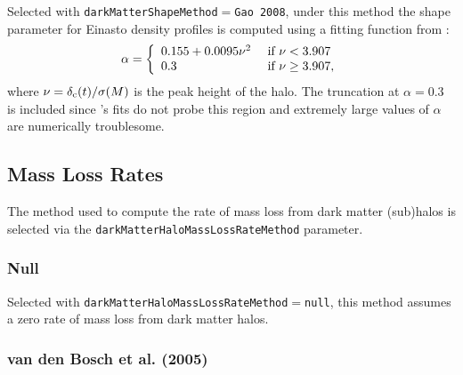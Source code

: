 Selected with {\tt darkMatterShapeMethod}$=${\tt Gao 2008}, under this method the shape parameter for Einasto density profiles is computed using a fitting function from \cite{gao_redshift_2008}:
\begin{equation}
\alpha = \left\{ \begin{array}{ll} 0.155 + 0.0095\nu^2 & \hbox{ if } \nu < 3.907 \\ 0.3 & \hbox{ if } \nu \ge 3.907, \end{array} \right.
\end{equation}
where $\nu=\delta_{\rm c}(t)/\sigma(M)$ is the peak height of the halo. The truncation at $\alpha = 0.3$ is included since \cite{gao_redshift_2008}'s fits do not probe this region and extremely large values of $\alpha$ are numerically troublesome.

\subsection{Mass Loss Rates}

The method used to compute the rate of mass loss from dark matter (sub)halos is selected via the {\tt darkMatterHaloMassLossRateMethod} parameter.

\subsubsection{Null}

Selected with {\tt darkMatterHaloMassLossRateMethod}$=${\tt null}, this method assumes a zero rate of mass loss from dark matter halos.

\subsubsection{van den Bosch et al. (2005)}

